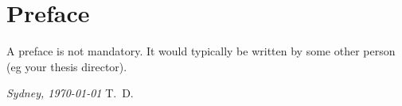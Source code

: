 \cleardoublepage
\chapter*{Preface}
A preface is not mandatory. It would typically be written by some other person (eg your thesis director).

\lipsum[1-2]

\bigskip
 
\noindent\textit{Sydney, \today}
\hfill T.~D.
